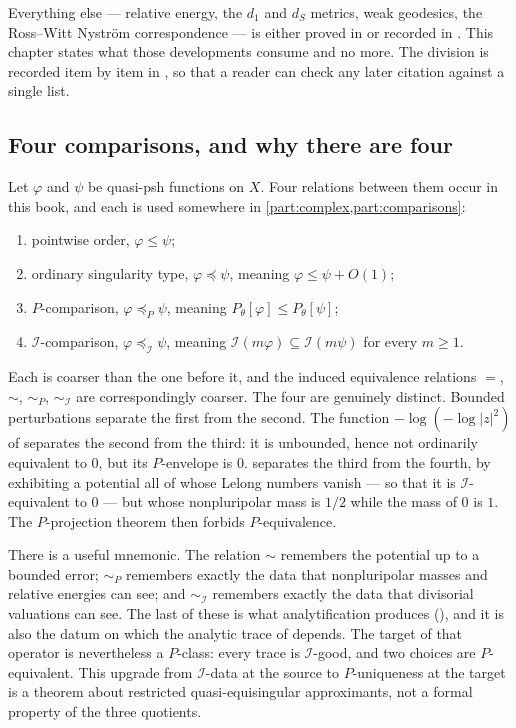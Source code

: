Everything else --- relative energy, the \(d_1\) and \(d_S\) metrics,
weak geodesics, the Ross--Witt Nystr\"om correspondence --- is either
proved in  or recorded in
.  This chapter states what those developments
consume and no more.  The division is recorded item by item in
, so that a reader can check any later citation
against a single list.

\subsection{Four comparisons, and why there are four}
\label{sec:ch51-four}

Let \(\varphi\) and \(\psi\) be quasi-psh functions on \(X\).  Four
relations between them occur in this book, and each is used somewhere in
\cref{part:complex,part:comparisons}:
\begin{enumerate}
\item pointwise order, \(\varphi\leq\psi\);
\item ordinary singularity type, \(\varphi\preceq\psi\), meaning
      \(\varphi\leq\psi+O(1)\);
\item \(P\)-comparison, \(\varphi\preceq_P\psi\), meaning
      \(P_\theta[\varphi]\leq P_\theta[\psi]\);
\item \(\mathcal I\)-comparison, \(\varphi\preceq_{\mathcal I}\psi\),
      meaning \(\mathcal I(m\varphi)\subseteq\mathcal I(m\psi)\) for every
      \(m\geq1\).
\end{enumerate}
Each is coarser than the one before it, and the induced equivalence
relations \(=\), \(\sim\), \(\sim_P\), \(\sim_{\mathcal I}\) are
correspondingly coarser.  The four are genuinely distinct.  Bounded
perturbations separate the first from the second.  The function
\(-\log(-\log|z|^2)\) of  separates the second from
the third: it is unbounded, hence not ordinarily equivalent to \(0\), but
its \(P\)-envelope is \(0\).   separates the third
from the fourth, by exhibiting a potential all of whose Lelong numbers
vanish --- so that it is \(\mathcal I\)-equivalent to \(0\) --- but whose
nonpluripolar mass is \(1/2\) while the mass of \(0\) is \(1\).  The
\(P\)-projection theorem then forbids \(P\)-equivalence.

There is a useful mnemonic.  The relation \(\sim\) remembers the
potential up to a bounded error; \(\sim_P\) remembers exactly the
data that nonpluripolar masses and relative energies can see; and
\(\sim_{\mathcal I}\) remembers exactly the data that divisorial
valuations can see.  The last of these is what analytification produces
(), and it is also the datum on which
the analytic trace of  depends.  The target of
that operator is nevertheless a \(P\)-class: every trace is
\(\mathcal I\)-good, and two choices are \(P\)-equivalent.  This upgrade
from \(\mathcal I\)-data at the source to \(P\)-uniqueness at the target is
a theorem about restricted quasi-equisingular approximants, not a formal
property of the three quotients.

